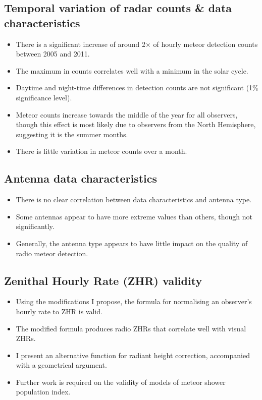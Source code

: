 \subsection{Temporal variation of radar counts \& data characteristics}
\begin{itemize}
	\item There is a significant increase of around 2$\times$ of hourly meteor detection counts between 2005 and 2011.
	\item The maximum in counts correlates well with a minimum in the solar cycle.
	\item Daytime and night-time differences in detection counts are not significant (1\% significance level).
	\item Meteor counts increase towards the middle of the year for all observers, though this effect is most likely due to observers from the North Hemisphere, suggesting it is the summer months.
	\item There is little variation in meteor counts over a month.
\end{itemize}
\subsection{Antenna data characteristics}
\begin{itemize}
	\item There is no clear correlation between data characteristics and antenna type.
	\item Some antennas appear to have more extreme values than others, though not significantly.
	\item Generally, the antenna type appears to have little impact on the quality of radio meteor detection.
\end{itemize}
\subsection{Zenithal Hourly Rate (ZHR) validity}
\begin{itemize}
	\item Using the modifications I propose, the formula for normalising an observer's hourly rate to ZHR is valid.
	\item The modified formula produces radio ZHRs that correlate well with visual ZHRs.
	\item I present an alternative function for radiant height correction, accompanied with a geometrical argument.
	\item Further work is required on the validity of models of meteor shower population index.
\end{itemize}
